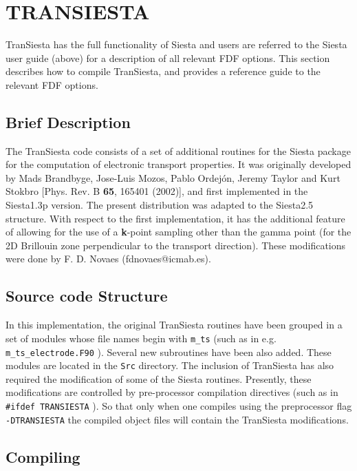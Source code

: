 \documentclass[11pt]{article}
\begin{document}
\section{TRANSIESTA}

{\sc TranSiesta} has the full functionality of 
{\sc Siesta} and users are referred to the {\sc Siesta} 
user guide (above) for a description of all relevant FDF options. 
This section describes how to compile  {\sc TranSiesta}, 
and provides a reference 
guide to the relevant FDF options. 


\subsection{Brief Description}

The {\sc TranSiesta} code consists of a set of additional 
routines for the {\sc Siesta} package for the computation of 
electronic transport properties. It was originally developed by 
Mads Brandbyge, Jose-Luis Mozos, Pablo Ordej\'on, Jeremy Taylor 
and Kurt Stokbro [Phys. Rev. B {\bf 65}, 165401 (2002)], and first 
implemented in the {\sc Siesta}1.3p version.  The present distribution 
was adapted to the {\sc Siesta}2.5 structure. With respect to the 
first implementation, it has the additional feature of allowing 
for the use of a {\bf k}-point sampling other than the gamma point 
(for the 2D Brillouin zone perpendicular to the transport direction). 
These modifications were done by F. D. Novaes (fdnovaes@icmab.es).

\subsection{Source code Structure}

In this implementation, the original {\sc TranSiesta} routines have 
been grouped in a set of modules whose file names begin with {\tt m\_ts} 
(such as in e.g. {\tt m\_ts\_electrode.F90} ). 
Several new subroutines have been also added. 
These modules are located in the {\tt Src} directory.  
The inclusion of {\sc TranSiesta} has also required the modification 
of some of the {\sc Siesta} routines. Presently, these modifications 
are controlled by pre-processor compilation directives (such as 
in {\tt \#ifdef TRANSIESTA} ). So that only when one compiles 
using the preprocessor flag {\tt -DTRANSIESTA} the compiled object 
files will contain the {\sc TranSiesta} modifications.

\subsection{Compiling}
\end{document}
